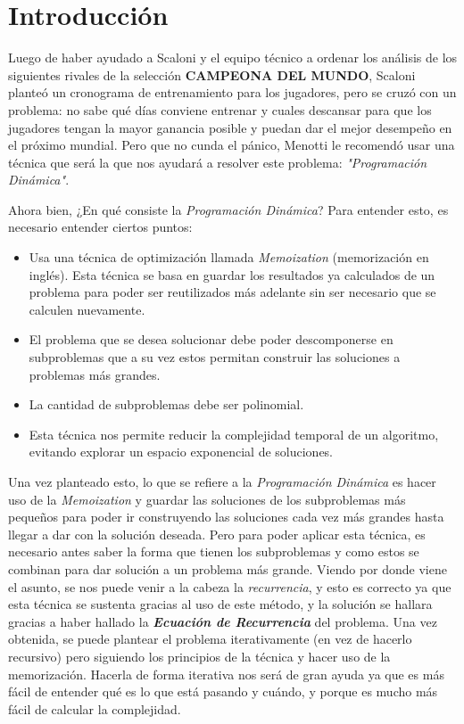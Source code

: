 \section{Introducción}

Luego de haber ayudado a Scaloni y el equipo técnico a ordenar los análisis de los siguientes rivales de la selección \textbf{CAMPEONA DEL MUNDO}, Scaloni planteó un cronograma de entrenamiento para los jugadores, pero se cruzó con un problema: no sabe qué días conviene entrenar y cuales descansar para que los jugadores tengan la mayor ganancia posible y puedan dar el mejor desempeño en el próximo mundial. Pero que no cunda el pánico, Menotti le recomendó usar una técnica que será la que nos ayudará a resolver este problema: \textit{"Programación Dinámica"}.

Ahora bien, ¿En qué consiste la \textit{Programación Dinámica}? Para entender esto, es necesario entender ciertos puntos:
\begin{itemize}
	\item Usa una técnica de optimización llamada \textit{Memoization} (memorización en inglés). Esta técnica se basa en guardar los resultados ya calculados de un problema para poder ser reutilizados más adelante sin ser necesario que se calculen nuevamente.
	\item El problema que se desea solucionar debe poder descomponerse en subproblemas que a su vez estos permitan construir las soluciones a problemas más grandes.
	\item La cantidad de subproblemas debe ser polinomial.
	\item Esta técnica nos permite reducir la complejidad temporal de un algoritmo, evitando explorar un espacio exponencial de soluciones.
\end{itemize}
Una vez planteado esto, lo que se refiere a la \textit{Programación Dinámica} es hacer uso de la \textit{Memoization} y guardar las soluciones de los subproblemas más pequeños para poder ir construyendo las soluciones cada vez más grandes hasta llegar a dar con la solución deseada. Pero para poder aplicar esta técnica, es necesario antes saber la forma que tienen los subproblemas y como estos se combinan para dar solución a un problema más grande.
Viendo por donde viene el asunto, se nos puede venir a la cabeza la \textit{recurrencia}, y esto es correcto ya que esta técnica se sustenta gracias al uso de este método, y la solución se hallara gracias a haber hallado la \textbf{\textit{Ecuación de Recurrencia}} del problema. Una vez obtenida, se puede plantear el problema iterativamente (en vez de hacerlo recursivo) pero siguiendo los principios de la técnica y hacer uso de la memorización. Hacerla de forma iterativa nos será de gran ayuda ya que es más fácil de entender qué es lo que está pasando y cuándo, y porque es mucho más fácil de calcular la complejidad.

